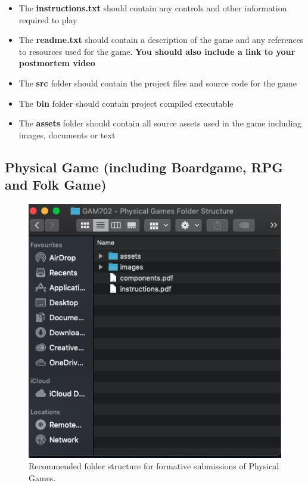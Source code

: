 \documentclass{../../fal_assignment}
\begin{document}
\begin{itemize}
	\item The \textbf{instructions.txt} should contain any controls and other information required to play
	\item The \textbf{readme.txt} should contain a description of the game and any references to resources used for the game. \textbf{You should also include a link to your postmortem video}
	\item The \textbf{src} folder should contain the project files and source code for the game
	\item The \textbf{bin} folder should contain project compiled executable
	\item The \textbf{assets} folder should contain all source assets used in the game including images, documents or text
\end{itemize}

\pagebreak
\pagebreak
\subsection*{Physical Game (including Boardgame, RPG and Folk Game)} 

\begin{figure}[H]
	\begin{center}
		\includegraphics[height=0.4\textheight]{physical_games_folder_structure}
	\end{center}
	\caption{Recommended folder structure for formative submissions of Physical Games.}
	\label{fig:phyical_game_folder_structure}
\end{figure}
\end{document}
